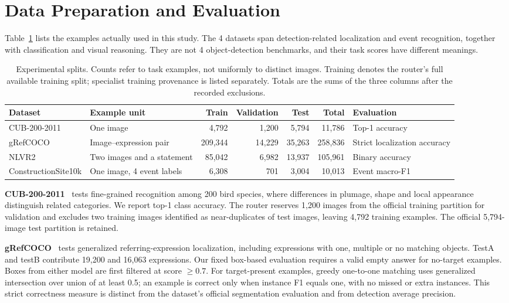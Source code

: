\section{Data Preparation and Evaluation}
\label{sec:datasets}
Table~\ref{tab:data} lists the examples actually used in this study. The 4 datasets span detection-related localization and event recognition, together with classification and visual reasoning. They are not 4 object-detection benchmarks, and their task scores have different meanings.

\begin{table}[H]
\centering
\caption{Experimental splits. Counts refer to task examples, not uniformly to distinct images. Training denotes the router's full available training split; specialist training provenance is listed separately. Totals are the sums of the three columns after the recorded exclusions.}
\label{tab:data}
\small\setlength{\tabcolsep}{5pt}
\begin{tabular}{@{}llrrrrl@{}}
\toprule
Dataset & Example unit & Train & Validation & Test & Total & Evaluation \\
\midrule
CUB-200-2011 & One image & 4,792 & 1,200 & 5,794 & 11,786 & Top-1 accuracy \\
gRefCOCO & Image--expression pair & 209,344 & 14,229 & 35,263 & 258,836 & Strict localization accuracy \\
NLVR2 & Two images and a statement & 85,042 & 6,982 & 13,937 & 105,961 & Binary accuracy \\
ConstructionSite10k & One image, 4 event labels & 6,308 & 701 & 3,004 & 10,013 & Event macro-F1 \\
\bottomrule
\end{tabular}
\end{table}

\textbf{CUB-200-2011}~\cite{cub} tests fine-grained recognition among 200 bird species, where differences in plumage, shape and local appearance distinguish related categories. We report top-1 class accuracy. The router reserves 1,200 images from the official training partition for validation and excludes two training images identified as near-duplicates of test images, leaving 4,792 training examples. The official 5,794-image test partition is retained.

\textbf{gRefCOCO}~\cite{gref} tests generalized referring-expression localization, including expressions with one, multiple or no matching objects. TestA and testB contribute 19,200 and 16,063 expressions. Our fixed box-based evaluation requires a valid empty answer for no-target examples. Boxes from either model are first filtered at score $\geq0.7$. For target-present examples, greedy one-to-one matching uses generalized intersection over union of at least 0.5; an example is correct only when instance F1 equals one, with no missed or extra instances. This strict correctness measure is distinct from the dataset's official segmentation evaluation and from detection average precision.

